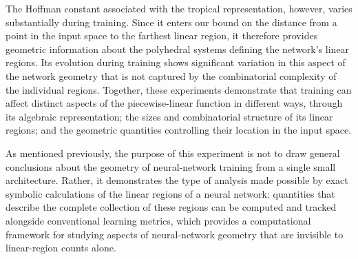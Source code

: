 \documentclass[10pt]{article}
\theoremstyle{definition}
\theoremstyle{remark}
\begin{document}
The Hoffman constant associated with the tropical representation, however, varies substantially during training. Since it enters our bound on the distance from a point in the input space to the farthest linear region, it therefore provides geometric information about the polyhedral systems defining the network's
linear regions. Its evolution during training shows significant variation in this aspect of the network geometry that is not captured by the combinatorial complexity of the individual regions. Together, these experiments demonstrate that training can affect distinct aspects of the piecewise-linear function in different ways, through its algebraic representation; the sizes and combinatorial structure of its linear regions; and the geometric quantities controlling their location
in the input space.

As mentioned previously, the purpose of this experiment is not to draw general conclusions about the geometry of neural-network training from a single small architecture. Rather, it demonstrates the type of analysis made possible by exact symbolic calculations of the linear regions of a neural network: quantities that describe the complete collection of these regions can be computed and tracked alongside conventional learning metrics, which provides a computational framework for studying aspects of neural-network geometry that are invisible to linear-region counts alone.
\end{document}
